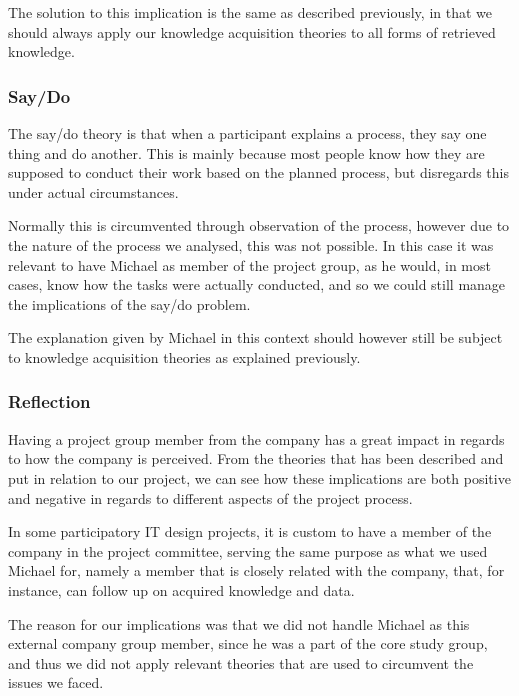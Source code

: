The solution to this implication is the same as described previously, in that we should always apply our knowledge acquisition theories to all forms of retrieved knowledge.

\subsubsection{Say/Do}

The say/do theory is that when a participant explains a process, they say one thing and do another. This is mainly because most people know how they are supposed to conduct their work based on the planned process, but disregards this under actual circumstances.

Normally this is circumvented through observation of the process, however due to the nature of the process we analysed, this was not possible. In this case it was relevant to have Michael as member of the project group, as he would, in most cases, know how the tasks were actually conducted, and so we could still manage the implications of the say/do problem.

The explanation given by Michael in this context should however still be subject to knowledge acquisition theories as explained previously.

\subsubsection{Reflection}

Having a project group member from the company has a great impact in regards to how the company is perceived. From the theories that has been described and put in relation to our project, we can see how these implications are both positive and negative in regards to different aspects of the project process.

In some participatory IT design projects, it is custom to have a member of the company in the project committee, serving the same purpose as what we used Michael for, namely a member that is closely related with the company, that, for instance, can follow up on acquired knowledge and data.

The reason for our implications was that we did not handle Michael as this external company group member, since he was a part of the core study group, and thus we did not apply relevant theories that are used to circumvent the issues we faced.

